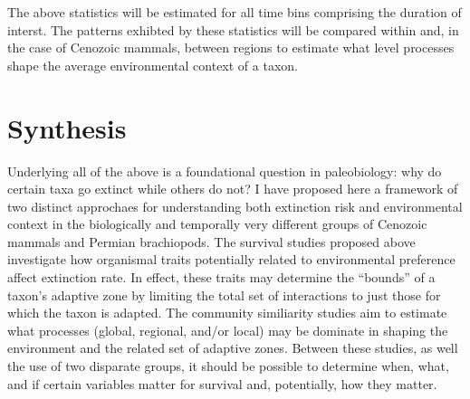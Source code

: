 \documentclass[12pt,letterpaper]{article}
\begin{document}
The above statistics will be estimated for all time bins comprising the duration of interst. The patterns exhibted by these statistics will be compared within and, in the case of Cenozoic mammals, between regions to estimate what level processes shape the average environmental context of a taxon.


\section{Synthesis}
Underlying all of the above is a foundational question in paleobiology: why do certain taxa go extinct while others do not? I have proposed here a framework of two distinct approchaes for understanding both extinction risk and environmental context in the biologically and temporally very different groups of Cenozoic mammals and Permian brachiopods. The survival studies proposed above investigate how organismal traits potentially related to environmental preference affect extinction rate. In effect, these traits may determine the ``bounds'' of a taxon's adaptive zone by limiting the total set of interactions to just those for which the taxon is adapted. The community similiarity studies aim to estimate what processes (global, regional, and/or local) may be dominate in shaping the environment and the related set of adaptive zones. Between these studies, as well the use of two disparate groups, it should be possible to determine when, what, and if certain variables matter for survival and, potentially, how they matter. 

\clearpage


\end{document}
